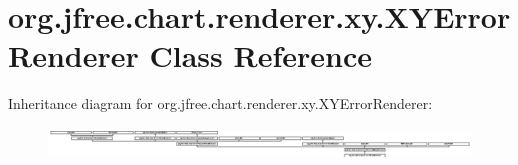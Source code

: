 \hypertarget{classorg_1_1jfree_1_1chart_1_1renderer_1_1xy_1_1_x_y_error_renderer}{}\section{org.\+jfree.\+chart.\+renderer.\+xy.\+X\+Y\+Error\+Renderer Class Reference}
\label{classorg_1_1jfree_1_1chart_1_1renderer_1_1xy_1_1_x_y_error_renderer}
Inheritance diagram for org.\+jfree.\+chart.\+renderer.\+xy.\+X\+Y\+Error\+Renderer\+:\begin{figure}[H]
\begin{center}
\leavevmode
\includegraphics[height=0.845922cm]{classorg_1_1jfree_1_1chart_1_1renderer_1_1xy_1_1_x_y_error_renderer}
\end{center}
\end{figure}
